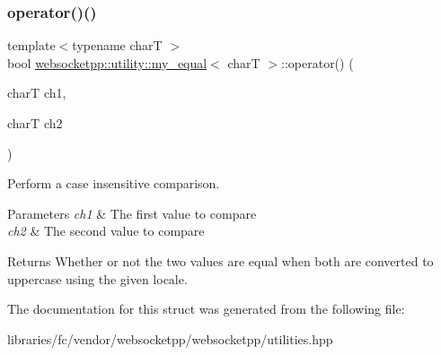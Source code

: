 \subsubsection{\texorpdfstring{operator()()}{operator()()}}
{\footnotesize\ttfamily template$<$typename charT $>$ \\
bool \mbox{\hyperlink{structwebsocketpp_1_1utility_1_1my__equal}{websocketpp\+::utility\+::my\+\_\+equal}}$<$ charT $>$\+::operator() (\begin{DoxyParamCaption}\item[{charT}]{ch1,  }\item[{charT}]{ch2 }\end{DoxyParamCaption})\hspace{0.3cm}{\ttfamily [inline]}}



Perform a case insensitive comparison. 


\begin{DoxyParams}{Parameters}
{\em ch1} & The first value to compare \\
\hline
{\em ch2} & The second value to compare \\
\hline
\end{DoxyParams}
\begin{DoxyReturn}{Returns}
Whether or not the two values are equal when both are converted to uppercase using the given locale. 
\end{DoxyReturn}


The documentation for this struct was generated from the following file\+:\begin{DoxyCompactItemize}
\item 
libraries/fc/vendor/websocketpp/websocketpp/utilities.\+hpp\end{DoxyCompactItemize}
